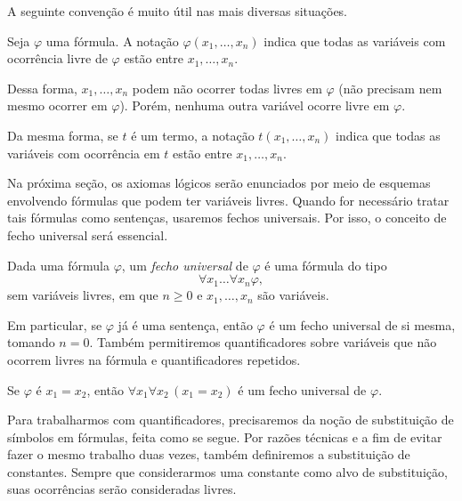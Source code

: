 A seguinte convenção é muito útil nas mais diversas situações.

\begin{convention}\label{conv:variaveisLivres}
    Seja $\varphi$ uma fórmula.
    A notação $\varphi(x_1, \dots, x_n)$ indica que todas as variáveis com ocorrência livre de $\varphi$ estão entre $x_1, \dots, x_n$.

    Dessa forma, $x_1, \dots, x_n$ podem não ocorrer todas livres em $\varphi$ (não precisam nem mesmo ocorrer em $\varphi$).
    Porém, nenhuma outra variável ocorre livre em $\varphi$.

    Da mesma forma, se $t$ é um termo, a notação $t(x_1, \dots, x_n)$ indica que todas as variáveis com ocorrência em $t$ estão entre $x_1, \dots, x_n$.
\end{convention}

Na próxima seção, os axiomas lógicos serão enunciados por meio de esquemas envolvendo fórmulas que podem ter variáveis livres.
Quando for necessário tratar tais fórmulas como sentenças, usaremos fechos universais.
Por isso, o conceito de fecho universal será essencial.

\begin{metadefinition}\label{mdef:fechoUniversal}
    Dada uma fórmula $\varphi$, um \emph{fecho universal} de $\varphi$ é uma fórmula do tipo
    \[
        \forall x_1 \dots \forall x_n \varphi,
    \]
    sem variáveis livres, em que $n\geq 0$ e $x_1,\dots,x_n$ são variáveis.

    Em particular, se $\varphi$ já é uma sentença, então $\varphi$ é um fecho universal de si mesma, tomando $n=0$.
    Também permitiremos quantificadores sobre variáveis que não ocorrem livres na fórmula e quantificadores repetidos.
\end{metadefinition}

\begin{example}\label{exa:fechoUniversal}
    Se $\varphi$ é $x_1 = x_2$, então $\forall x_1 \forall x_2 \,(x_1 = x_2)$ é um fecho universal de $\varphi$.
\end{example}

Para trabalharmos com quantificadores, precisaremos da noção de substituição de símbolos em fórmulas, feita como se segue.
Por razões técnicas e a fim de evitar fazer o mesmo trabalho duas vezes, também definiremos a substituição de constantes.
Sempre que considerarmos uma constante como alvo de substituição, suas ocorrências serão consideradas livres.

